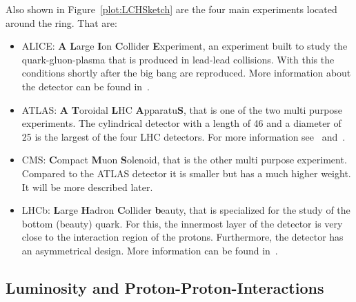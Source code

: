 Also shown in Figure~\ref{plot:LCHSketch} are the four main experiments located around the ring. That are:
\begin{itemize}
\item{ALICE}: \textbf{A} \textbf{L}arge \textbf{I}on \textbf{C}ollider \textbf{E}xperiment, an experiment built to study the quark-gluon-plasma that is produced in lead-lead collisions. With this the conditions shortly after the big bang are reproduced. More information about the detector can be found in~.
\item{ATLAS}: \textbf{A} \textbf{T}oroidal \textbf{L}HC \textbf{A}pparatu\textbf{S}, that is one of the two multi purpose experiments. The cylindrical detector with a length of 46\m{} and a diameter of 25\m{} is the largest of the four LHC detectors. For more information see~ and~.
\item{CMS}: \textbf{C}ompact \textbf{M}uon \textbf{S}olenoid, that is the other multi purpose experiment. Compared to the ATLAS detector it is smaller but has a much higher weight. It will be more described later.
\item{LHCb}: \textbf{L}arge \textbf{H}adron \textbf{C}ollider \textbf{b}eauty, that is specialized for the study of the bottom (beauty) quark. For this, the innermost layer of the detector is very close to the interaction region of the protons. Furthermore, the detector has an asymmetrical design. More information can be found in~.
\end{itemize}


\subsection{Luminosity and Proton-Proton-Interactions \label{sec:IntroLumiPPI}}

